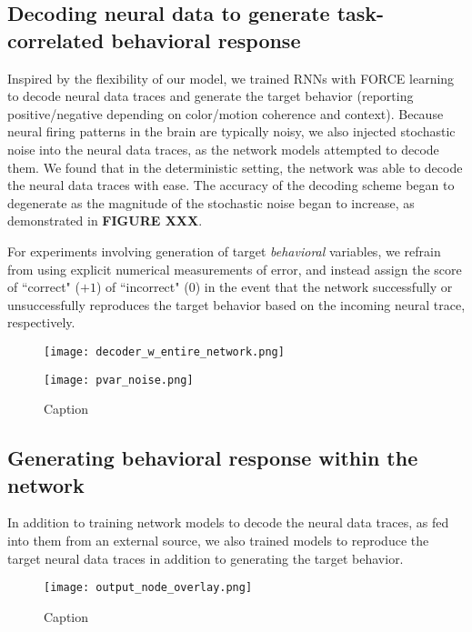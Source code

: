 \documentclass[12pt,a4paper,final]{iopart}
\begin{document}
\subsection{Decoding neural data to generate task-correlated behavioral response}
Inspired by the flexibility of our model, we trained RNNs with FORCE learning to decode neural data traces and generate the target behavior (reporting positive/negative depending on color/motion coherence and context). Because neural firing patterns in the brain are typically noisy, we also injected stochastic noise into the neural data traces, as the network models attempted to decode them. We found that in the deterministic setting, the network was able to decode the neural data traces with ease. The accuracy of the decoding scheme began to degenerate as the magnitude of the stochastic noise began to increase, as demonstrated in \textbf{FIGURE XXX}. 

For experiments involving generation of target \emph{behavioral} variables, we refrain from using explicit numerical measurements of error, and instead assign the score of ``correct" ($+1$) of ``incorrect" ($0$) in the event that the network successfully or unsuccessfully reproduces the target behavior based on the incoming neural trace, respectively.
\begin{figure}
    \centering
    \begin{minipage}{0.495\linewidth}
        \centering
        \texttt{[image: decoder\_w\_entire\_network.png]}
    \end{minipage}
    \begin{minipage}{0.495\linewidth}
        \centering
        \texttt{[image: pvar\_noise.png]}
    \end{minipage}
    \caption{Caption}
    \label{fig:my_label}
\end{figure}

\subsection{Generating behavioral response within the network}
In addition to training network models to decode the neural data traces, as fed into them from an external source, we also trained models to reproduce the target neural data traces in addition to generating the target behavior. 
\begin{figure}
    \centering
    \texttt{[image: output\_node\_overlay.png]}
    \caption{Caption}
    \label{fig:my_label}
\end{figure}
\end{document}
